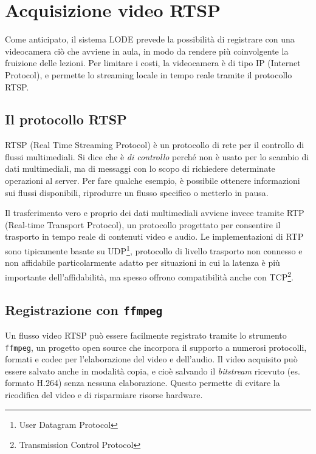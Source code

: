 \chapter{Acquisizione video RTSP}
\label{cha:rtsp}

Come anticipato, il sistema LODE prevede la possibilità di registrare con una videocamera ciò che avviene in aula, in modo da rendere più coinvolgente la fruizione delle lezioni. Per limitare i costi, la videocamera è di tipo IP (Internet Protocol), e permette lo streaming locale in tempo reale tramite il protocollo RTSP.

\section{Il protocollo RTSP}
\label{sec:rtsp_protocollo}

RTSP (Real Time Streaming Protocol) è un protocollo di rete per il controllo di flussi multimediali. Si dice che è \emph{di controllo} perché non è usato per lo scambio di dati multimediali, ma di messaggi con lo scopo di richiedere determinate operazioni al server. Per fare qualche esempio, è possibile ottenere informazioni sui flussi disponibili, riprodurre un flusso specifico o metterlo in pausa.\cite{rfc2326}

Il trasferimento vero e proprio dei dati multimediali avviene invece tramite RTP (Real-time Transport Protocol), un protocollo progettato per consentire il trasporto in tempo reale di contenuti video e audio. Le implementazioni di RTP sono tipicamente basate su UDP\footnote{User Datagram Protocol}, protocollo di livello trasporto non connesso e non affidabile particolarmente adatto per situazioni in cui la latenza è più importante dell'affidabilità, ma spesso offrono compatibilità anche con TCP\footnote{Transmission Control Protocol}.

\section{Registrazione con \texttt{ffmpeg}}
\label{sec:rtsp_ffmpeg}

Un flusso video RTSP può essere facilmente registrato tramite lo strumento \texttt{ffmpeg}, un progetto open source che incorpora il supporto a numerosi protocolli, formati e codec per l'elaborazione del video e dell'audio. Il video acquisito può essere salvato anche in modalità copia, e cioè salvando il \emph{bitstream} ricevuto (es. formato H.264) senza nessuna elaborazione. Questo permette di evitare la ricodifica del video e di risparmiare risorse hardware.

